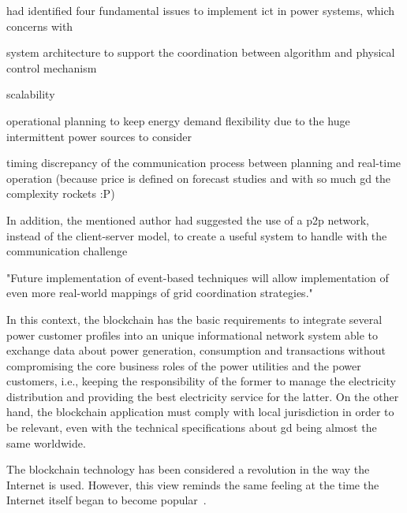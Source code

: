  had identified four fundamental issues to implement \gls{ict} in power systems, which concerns with
\begin{itemize*}[label=(\roman*), itemjoin={{; }}, itemjoin*={{; and }}]
    \item system architecture to support the coordination between algorithm and physical control mechanism
    \item scalability
    \item operational planning to keep energy demand flexibility due to the huge intermittent power sources to consider
    \item timing discrepancy of the communication process between planning and real-time operation (because price is defined on forecast studies and with so much \gls{gd} the complexity rockets :P)
\end{itemize*}
In addition, the mentioned author had suggested the use of a \gls{p2p} network, instead of the client-server model, to create a useful system to handle with the communication challenge

"Future implementation of event-based techniques will allow implementation of even more real-world mappings of grid coordination strategies."




In this context, the blockchain has the basic requirements to integrate several power customer profiles into an unique informational network system able to exchange data about power generation, consumption and transactions without compromising the core business roles of the power utilities and the power customers, i.e., keeping the responsibility of the former to manage the electricity distribution and providing the best electricity service for the latter.
On the other hand, the blockchain application must comply with local jurisdiction in order to be relevant, even with the technical specifications about \gls{gd} being almost the same worldwide.

The blockchain technology has been considered a revolution in the way the Internet is used.
However, this view reminds the same feeling at the time the Internet itself began to become popular~\cite{book:internet}.

